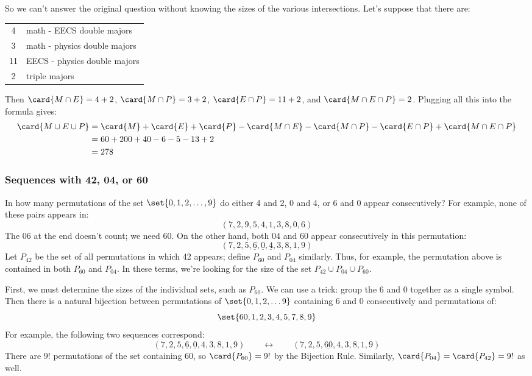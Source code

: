 So we can't answer the original question without knowing the sizes of
the various intersections.  Let's suppose that there are:
%
\begin{center}
\begin{tabular}{cl}
4 & math - EECS double majors \\
3 & math - physics double majors \\
11 & EECS - physics double majors \\
2 & triple majors
\end{tabular}
\end{center}
%
Then $\card{M \cap E} = 4 + 2$, $\card{M \cap P} = 3 + 2$, $\card{E
\cap P} = 11 + 2$, and $\card{M \cap E \cap P} = 2$.  Plugging all this
into the formula gives:
%
\begin{align*}
\card{M \cup E \cup P}
    & = \card{M} + \card{E} + \card{P}
      - \card{M \cap E} - \card{M \cap P} - \card{E \cap P}
      + \card{M \cap E \cap P} \\
    & = 60 + 200 + 40 - 6 - 5 - 13 + 2 \\
    & = 278
\end{align*}

\subsubsection{Sequences with 42, 04, or 60}

In how many permutations of the set $\set{0, 1, 2, \dots, 9}$ do
either 4 and 2, 0 and 4, or 6 and 0 appear consecutively?  For
example, none of these pairs appears in:
%
\[
(7, 2, 9, 5, 4, 1, 3, 8, 0, 6)
\]
%
The 06 at the end doesn't count; we need 60.  On the other hand, both
04 and 60 appear consecutively in this permutation:
%
\[
(7, 2, 5, \underline{6}, \underline{0}, \underline{4}, 3, 8, 1, 9)
\]
%
Let $P_{42}$ be the set of all permutations in which 42 appears; define
$P_{60}$ and $P_{04}$ similarly.  Thus, for example, the permutation above
is contained in both $P_{60}$ and $P_{04}$.  In these terms, we're looking
for the size of the set $P_{42} \cup P_{04} \cup P_{60}$.

First, we must determine the sizes of the individual sets, such as
$P_{60}$.  We can use a trick: group the 6 and 0 together as a single
symbol.  Then there is a natural bijection between permutations of
$\set{0, 1, 2, \dots 9}$ containing 6 and 0 consecutively and
permutations of:
%
\[
\set{60, 1, 2, 3, 4, 5, 7, 8, 9}
\]
%
For example, the following two sequences correspond:
%
\[
(7, 2, 5, \underline{6}, \underline{0}, 4, 3, 8, 1, 9)
\qquad \leftrightarrow \qquad
(7, 2, 5, \underline{60}, 4, 3, 8, 1, 9)
\]
%
There are $9!$ permutations of the set containing 60, so
$\card{P_{60}} = 9!$ by the Bijection Rule.  Similarly, $\card{P_{04}}
= \card{P_{42}} = 9!$ as well.

